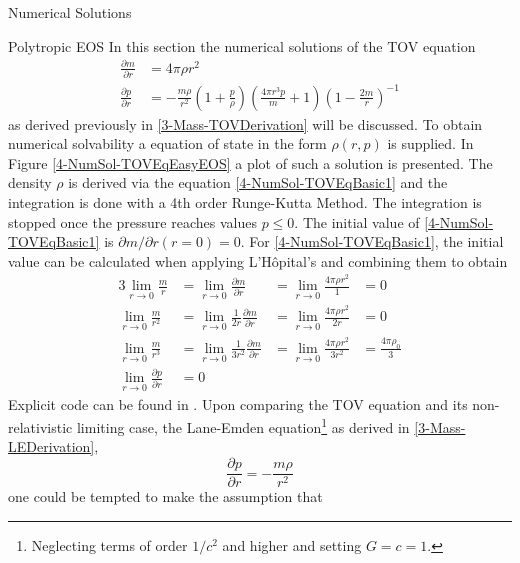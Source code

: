 \begin{section}{Numerical Solutions}
\begin{subsection}{Polytropic EOS}
In this section the numerical solutions of the TOV equation
\begin{align}
	\frac{\partial m}{\partial r} &= 4\pi\rho r^2\label{4-NumSol-TOVEqBasic1}\\
	\frac{\partial p}{\partial r} &=-\frac{m\rho}{r^2}\left(1+\frac{p}{\rho}\right)\left(\frac{4\pi r^3p}{m}+1\right)\left(1-\frac{2m}{r}\right)^{-1}
	\label{4-NumSol-TOVEqBasic2}
\end{align}
as derived previously in \ref{3-Mass-TOVDerivation} will be discussed. To obtain numerical solvability a equation of state in the form $\rho(r,p)$ is supplied. 
In Figure \ref{4-NumSol-TOVEqEasyEOS} a plot of such a solution is presented.
The density $\rho$ is derived via the equation \ref{4-NumSol-TOVEqBasic1} and the integration is done with a 4th order Runge-Kutta Method. The integration is stopped once the pressure reaches values $p\leq0$. The initial value of \ref{4-NumSol-TOVEqBasic1} is $\partial m/\partial r(r=0)=0$. For \ref{4-NumSol-TOVEqBasic1}, the initial value can be calculated when applying L'Hôpital's and combining them to obtain
\begin{alignat}{3}
	\lim\limits_{r\rightarrow0}\frac{m}{r} &= \lim\limits_{r\rightarrow0}\frac{\partial m}{\partial r} &=\lim\limits_{r\rightarrow0}\frac{4\pi\rho r^2}{1} &= 0\\
	\lim\limits_{r\rightarrow0}\frac{m}{r^2} &= \lim\limits_{r\rightarrow0}\frac{1}{2r}\frac{\partial m}{\partial r}  &= \lim\limits_{r\rightarrow0}\frac{4\pi\rho r^2}{2r} &= 0\\
	\lim\limits_{r\rightarrow0}\frac{m}{r^3} &= \lim\limits_{r\rightarrow0}\frac{1}{3r^2}\frac{\partial m}{\partial r} &=\lim\limits_{r\rightarrow0}\frac{4\pi\rho r^2}{3r^2} &= \frac{4\pi\rho_0}{3}\\
	\lim\limits_{r\rightarrow0}\frac{\partial p}{\partial r} &= 0
\end{alignat}
Explicit code can be found in \cite{pleyerGithubRepositoryJonas}. Upon comparing the TOV equation and its non-relativistic limiting case, the Lane-Emden equation\footnote{Neglecting terms of order $1/c^2$ and higher and setting $G=c=1$.} as derived in \ref{3-Mass-LEDerivation},
\begin{equation}
	\frac{\partial p}{\partial r} = -\frac{m\rho}{r^2}
\end{equation}
one could be tempted to make the assumption that

\end{subsection}
\end{section}
